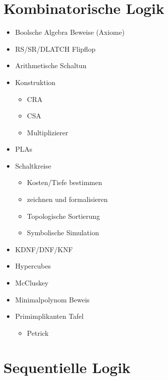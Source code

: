 \documentclass{scrartcl}[9pt, a4paper]
\begin{document}
\pagebreak
\section*{Kombinatorische Logik}

\begin{itemize}
	\item Boolsche Algebra Beweise (Axiome)
	\item RS/SR/DLATCH Flipflop
	\item Arithmetische Schaltun
	\item Konstruktion
	      \begin{itemize}
	      	\item CRA
	      	\item CSA
	      	\item Multiplizierer
	      \end{itemize}
	\item PLAs
	\item Schaltkreise

	      \begin{itemize}
	      	\item Kosten/Tiefe bestimmen
	      	\item zeichnen und formalisieren
	      	\item Topologische Sortierung
	      	\item Symbolische Simulation
	      \end{itemize}

	\item KDNF/DNF/KNF
	\item Hypercubes
	\item McCluskey
	\item Minimalpolynom Beweis
	\item Primimplikanten Tafel
	      \begin{itemize}
	      	\item Petrick
	      \end{itemize}
\end{itemize}

\pagebreak
\section*{Sequentielle Logik}
\end{document}
